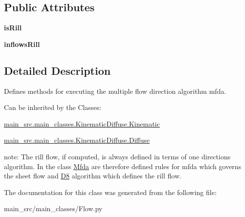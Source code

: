 \subsection*{Public Attributes}
\begin{DoxyCompactItemize}
\item 
\hypertarget{classmain__src_1_1main__classes_1_1Flow_1_1Mfda_af2ea879535b172c375daa21a9840a208}{{\bfseries is\-Rill}}\label{classmain__src_1_1main__classes_1_1Flow_1_1Mfda_af2ea879535b172c375daa21a9840a208}

\item 
\hypertarget{classmain__src_1_1main__classes_1_1Flow_1_1Mfda_a881e5c860e7c8b0fae791b7e2bcedd04}{{\bfseries inflows\-Rill}}\label{classmain__src_1_1main__classes_1_1Flow_1_1Mfda_a881e5c860e7c8b0fae791b7e2bcedd04}

\end{DoxyCompactItemize}


\subsection{Detailed Description}
Defines methods for executing the multiple flow direction algorithm mfda. 

Can be inherited by the Classes\-:


\begin{DoxyItemize}
\item \hyperlink{classmain__src_1_1main__classes_1_1KinematicDiffuse_1_1Kinematic}{main\-\_\-src.\-main\-\_\-classes.\-Kinematic\-Diffuse.\-Kinematic}
\item \hyperlink{classmain__src_1_1main__classes_1_1KinematicDiffuse_1_1Diffuse}{main\-\_\-src.\-main\-\_\-classes.\-Kinematic\-Diffuse.\-Diffuse}
\end{DoxyItemize}

note\-: The rill flow, if computed, is always defined in terms of one directions algorithm. In the class \hyperlink{classmain__src_1_1main__classes_1_1Flow_1_1Mfda}{Mfda} are therefore defined rules for mfda which governs the sheet flow and \hyperlink{classmain__src_1_1main__classes_1_1Flow_1_1D8}{D8} algorithm which defines the rill flow. 

The documentation for this class was generated from the following file\-:\begin{DoxyCompactItemize}
\item 
main\-\_\-src/main\-\_\-classes/Flow.\-py\end{DoxyCompactItemize}
